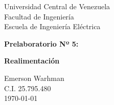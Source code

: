 \begin{titlepage}
    \centering
    \Large
    Universidad Central de Venezuela\\
    Facultad de Ingeniería\\
    Escuela de Ingeniería Eléctrica
    \vspace*{8cm}

    \Huge
    \textbf{Prelaboratorio Nº 5:} 

    \textbf{Realimentación}
    \vfill


    \Large

    Emerson Warhman \\
    C.I. 25.795.480 \\
    \today

\end{titlepage}